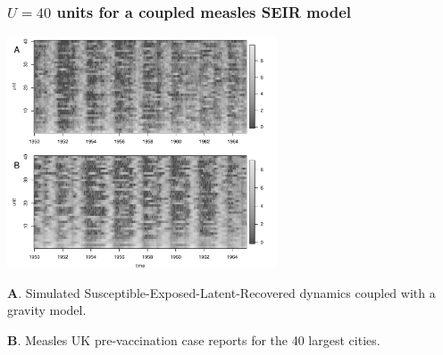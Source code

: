 \documentclass{beamer}
\begin{document}
\begin{frame}
\frametitle{$U=40$ units for a coupled measles SEIR model}

\vspace{-2.7mm}

\begin{center}
\includegraphics[width=8cm]{slice_image_plot-1.pdf}
\end{center}

\vspace{-3mm}

{\bf A}. Simulated Susceptible-Exposed-Latent-Recovered dynamics coupled with a gravity model.

{\bf B}. Measles UK pre-vaccination case reports for the 40 largest cities.





\end{frame}
\end{document}
